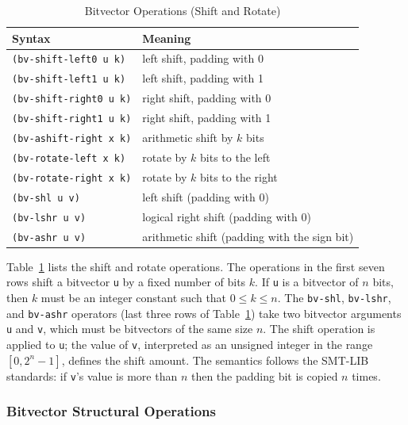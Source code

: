 \documentclass[11pt,twoside,fleqn,openright,titlepage]{cslreport}
\begin{document}
\begin{table}
\begin{small}
\begin{center}
\begin{tabular}{|p{5cm}|l|}
\hline
Syntax & Meaning \\
\hline
\texttt{(bv-shift-left0 u k)} & left shift, padding with 0\\
\texttt{(bv-shift-left1 u k)} & left shift, padding with 1\\
\texttt{(bv-shift-right0 u k)} & right shift, padding with 0\\
\texttt{(bv-shift-right1 u k)} & right shift, padding with 1\\
\texttt{(bv-ashift-right x k)} &  arithmetic shift by $k$ bits\\
\texttt{(bv-rotate-left x k)} & rotate by $k$ bits to the left\\
\texttt{(bv-rotate-right x k)} & rotate by $k$ bits to the right\\
\hline
\texttt{(bv-shl u v)} & left shift (padding with 0)\\
\texttt{(bv-lshr u v)} & logical right shift (padding with 0) \\
\texttt{(bv-ashr u v)} & arithmetic shift (padding with the sign bit)\\
\hline
\end{tabular}
\end{center}
\end{small}
\caption{Bitvector Operations (Shift and Rotate)}
\label{bitvectors2}
\end{table}

Table~\ref{bitvectors2} lists the shift and rotate operations. The
operations in the first seven rows shift a bitvector \texttt{u} by a
fixed number of bits $k$. If \texttt{u} is a bitvector of $n$ bits,
then $k$ must be an integer constant such that $0 \leq k \leq n$. The
\texttt{bv-shl}, \texttt{bv-lshr}, and \texttt{bv-ashr} operators
(last three rows of Table~\ref{bitvectors2}) take two bitvector
arguments \texttt{u} and \texttt{v}, which must be bitvectors of the
same size $n$. The shift operation is applied to \texttt{u}; the value
of \texttt{v}, interpreted as an unsigned integer in the range $[0,
  2^n-1]$, defines the shift amount. The semantics follows the SMT-LIB
standards: if \texttt{v}'s value is more than $n$ then the padding bit
is copied $n$ times.

\subsubsection*{Bitvector Structural Operations}
\end{document}

